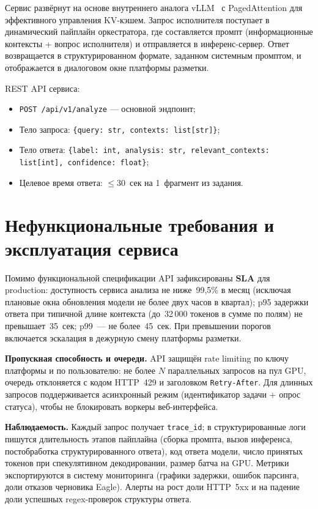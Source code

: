 \documentclass[times]{itmo-student-thesis}
\begin{document}
Сервис развёрнут на основе внутреннего аналога vLLM~\cite{kwon2023vllm}
с PagedAttention для эффективного управления KV-кэшем.
Запрос исполнителя поступает в динамический пайплайн оркестратора,
где составляется промпт (информационные контексты + вопрос исполнителя)
и отправляется в инференс-сервер. Ответ возвращается в структурированном
формате, заданном системным промптом, и отображается в диалоговом окне
платформы разметки.

REST API сервиса:
\begin{itemize}
    \item \texttt{POST /api/v1/analyze} — основной эндпоинт;
    \item Тело запроса: \texttt{\{query: str, contexts: list[str]\}};
    \item Тело ответа: \texttt{\{label: int, analysis: str,
          relevant\_contexts: list[int], confidence: float\}};
    \item Целевое время ответа: $\le 30$~сек на 1~фрагмент из задания.
\end{itemize}

\section{Нефункциональные требования и эксплуатация сервиса}

Помимо функциональной спецификации API зафиксированы \textbf{SLA}
для production: доступность сервиса анализа не ниже~99{,}5\% в месяц
(исключая плановые окна обновления модели не более двух часов
в квартал); p95 задержки ответа при типичной длине контекста
(до~32\,000 токенов в сумме по полям) не превышает~35~сек;
p99~--- не более~45~сек. При превышении порогов включается эскалация
в дежурную смену платформы разметки.

\textbf{Пропускная способность и очереди.} API защищён
rate limiting по ключу платформы и по пользователю: не более
$N$ параллельных запросов на пул GPU, очередь отклоняется с кодом
HTTP~429 и заголовком \texttt{Retry-After}. Для длинных запросов
поддерживается асинхронный режим (идентификатор задачи + опрос статуса),
чтобы не блокировать воркеры веб-интерфейса.

\textbf{Наблюдаемость.} Каждый запрос получает \texttt{trace\_id};
в структурированные логи пишутся длительность этапов пайплайна
(сборка промпта, вызов инференса, постобработка структурированного ответа),
код ответа
модели, число принятых токенов при спекулятивном декодировании,
размер батча на GPU. Метрики экспортируются в систему мониторинга
(графики задержки, ошибок парсинга, доли отказов черновика Eagle).
Алерты на рост доли HTTP~5xx и на падение доли успешных regex-проверок
структуры ответа.
\end{document}
